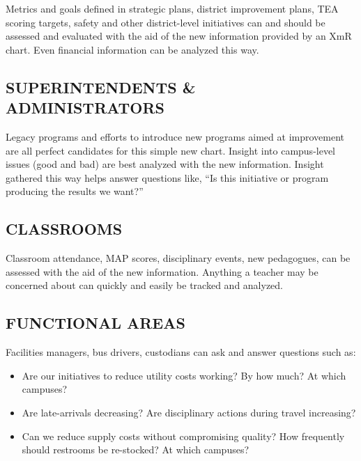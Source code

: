 \documentclass[
  letterpaper,
  DIV=11,
  numbers=noendperiod]{scrartcl}
\begin{document}
Metrics and goals defined in strategic plans, district improvement
plans, TEA scoring targets, safety and other district-level initiatives
can and should be assessed and evaluated with the aid of the new
information provided by an XmR chart. Even financial information can be
analyzed this way.

\vspace{0.3in}

\subsection{\texorpdfstring{\textbf{SUPERINTENDENTS \&
ADMINISTRATORS}}{SUPERINTENDENTS \& ADMINISTRATORS}}\label{superintendents-administrators}

Legacy programs and efforts to introduce new programs aimed at
improvement are all perfect candidates for this simple new chart.
Insight into campus-level issues (good and bad) are best analyzed with
the new information. Insight gathered this way helps answer questions
like, ``Is this initiative or program producing the results we want?''

\vspace{0.3in}

\subsection{\texorpdfstring{\textbf{CLASSROOMS}}{CLASSROOMS}}\label{classrooms}

Classroom attendance, MAP scores, disciplinary events, new pedagogues,
can be assessed with the aid of the new information. Anything a teacher
may be concerned about can quickly and easily be tracked and analyzed.

\vspace{0.3in}

\subsection{\texorpdfstring{\textbf{FUNCTIONAL
AREAS}}{FUNCTIONAL AREAS}}\label{functional-areas}

Facilities managers, bus drivers, custodians can ask and answer
questions such as:

\begin{itemize}
\item
  Are our initiatives to reduce utility costs working? By how much? At
  which campuses?
\item
  Are late-arrivals decreasing? Are disciplinary actions during travel
  increasing?
\item
  Can we reduce supply costs without compromising quality? How
  frequently should restrooms be re-stocked? At which campuses?
\end{itemize}
\end{document}
